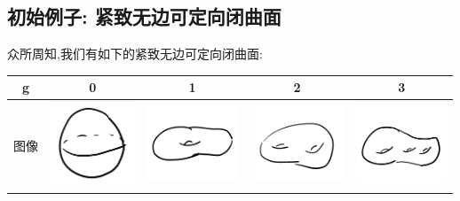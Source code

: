 \documentclass[UTF8,12pt,twoside]{article}
\theoremstyle{definition}
\numberwithin{equation}{section}
\begin{document}
\subsection{初始例子: 紧致无边可定向闭曲面}
众所周知,我们有如下的紧致无边可定向闭曲面: 
\begin{center}
	\begin{tabular}{|c|c|c|c|c|}
		\hline
		g&0&1&2&3	\\
		\hline
		图像&\begin{minipage}[m]{3cm}
			\vspace{1mm}
			\centering\includegraphics[width=2.5cm]{9-7-fig/genus0.png}
		\end{minipage}&\begin{minipage}[m]{3cm}
			\centering\includegraphics[width=2.7cm]{9-7-fig/genus1.png}
		\end{minipage}&\begin{minipage}[m]{3cm}
			\centering\includegraphics[width=2.8cm]{9-7-fig/genus2.png}
		\end{minipage}&\begin{minipage}[m]{3cm}
			\centering\includegraphics[width=2.7cm]{9-7-fig/genus3.png}
		\end{minipage}	\\
		\hline
	\end{tabular}
\end{center}
\end{document}
